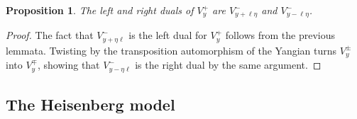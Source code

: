\documentclass[11pt]{report}
\newtheorem{prop}[theorem]{Proposition}
\theoremstyle{definition}
\theoremstyle{remark}
\theoremstyle{remark}
\begin{document}
\begin{prop}
The left and right duals of $V_y^+$ are $V_{y+\ell\eta}^-$ and $V_{y-\ell\eta}^-$.
\end{prop}

\begin{proof}
The fact that $V_{y+\eta\ell}^-$ is the left dual for $V_y^+$ follows from the previous lemmata. Twisting by the transposition automorphism of the Yangian turns $V_y^\pm$ into $V_y^\mp$, showing that $V_{y-\eta\ell}^-$ is the right dual by the same argument.
\end{proof}

\subsection{The Heisenberg model}
\end{document}
